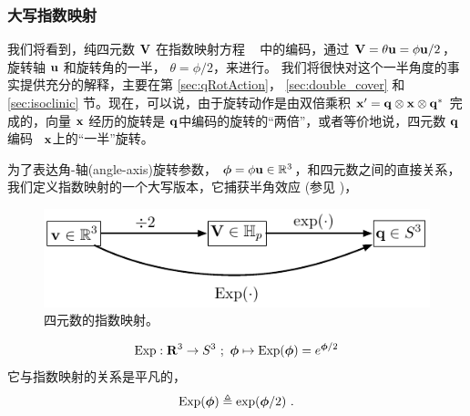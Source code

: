 \subsubsection{大写指数映射}

我们将看到，纯四元数 ${\bf V}$ 在指数映射方程 ~ 中的编码，通过 ${\bf V}=\theta{\bf u} = \phi{\bf u}/2$，旋转轴 ${\bf u}$ 和旋转角的一半， $\theta=\phi/2$，来进行。
我们将很快对这个一半角度的事实提供充分的解释，主要在第 \ref{sec:qRotAction}， \ref{sec:double_cover} 和 \ref{sec:isoclinic} 节。现在，可以说，由于旋转动作是由双倍乘积 ${\bf x}'={\bf q}\otimes{\bf x}\otimes{\bf q}^*$ 完成的，向量 ${\bf x}$ 经历的旋转是 ${\bf q}$中编码的旋转的“两倍”，或者等价地说，四元数 ${\bf q}$ 编码 ~${\bf x}$上的“一半”旋转。

为了表达角-轴(angle-axis)旋转参数， ${\bm \phi}=\phi{\bf u}\in{\mathbb R}^3$，和四元数之间的直接关系，我们定义指数映射的一个大写版本，它捕获半角效应 (参见 )，
%
\begin{figure}[tb]
\begin{center}
\includegraphics{figures/exp_map_q}
\caption{四元数的指数映射。}
\label{fig:exp_map_q}
\end{center}
\end{figure}
%
\begin{align}
\operatorname*{Exp}:{\bf R}^3\to S^3~;~{\bm \phi}\mapsto\operatorname*{Exp}({\bm \phi})=e^{{\bm \phi}/2}
\end{align}
%
它与指数映射的关系是平凡的，
%
\begin{align}
\operatorname*{Exp}({\bm \phi}) \triangleq \exp({\bm \phi}/2)
~.
\end{align}



